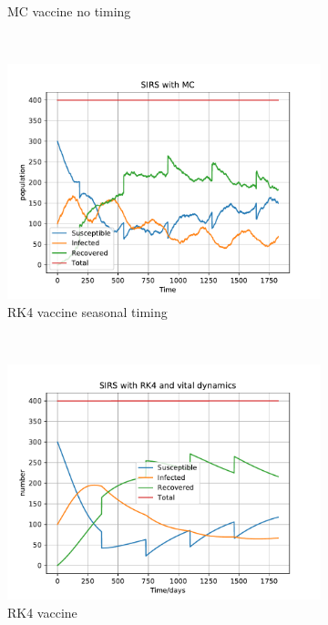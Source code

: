 \begin{figure}[H]
\begin{subfigure}{0.30\textwidth}
         \caption{MC vaccine no timing}
    \end{subfigure}
     ~ 
    \begin{subfigure}{0.30\textwidth}
         \centering
         \includegraphics[width=\linewidth]{../fig/newfig/MC_vaccine_SVA=4_T=5f=40_timing.pdf}
         \caption{RK4 vaccine seasonal timing}
    \end{subfigure}
     ~ 
    \begin{subfigure}{0.30\textwidth}
         \centering
         \includegraphics[width=\linewidth]{../fig/newfig/RK4Vaccine_f=40_T=5.pdf}
         \caption{RK4 vaccine}
    \end{subfigure}
     ~ 
    \begin{subfigure}{0.30\textwidth}

\end{subfigure}
\end{figure}
